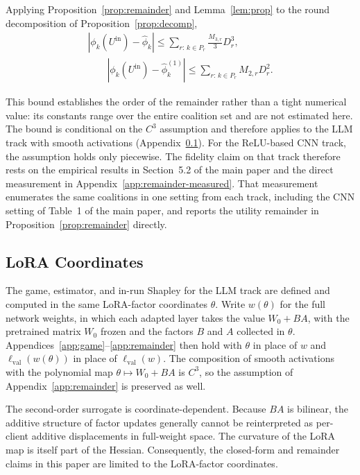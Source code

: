 \documentclass[letterpaper]{article} %
\providecommand{\lval}{\ell_{\mathrm{val}}}
\theoremstyle{definition}
\begin{document}
\begin{corollary}
\label{cor:player}
Applying Proposition~\ref{prop:remainder} and Lemma~\ref{lem:prop} to the
round decomposition of Proposition~\ref{prop:decomp},
\[
\begin{aligned}
|\phi_k(U^{\mathrm{in}}) - \hat\phi_k|
\le \sum_{r:\,k \in P_r} \tfrac{M_{3,r}}{3} D_r^3,
\\
\qquad
|\phi_k(U^{\mathrm{in}}) - \hat\phi_k^{(1)}|
\le \sum_{r:\,k \in P_r} M_{2,r} D_r^2.
\end{aligned}
\]
\end{corollary}

This bound establishes the order of the remainder rather than a tight
numerical value: its constants range over the entire coalition set and are not
estimated here. The bound is conditional on the $C^3$ assumption and therefore
applies to the LLM track with smooth activations
(Appendix~\ref{app:lora}). For the ReLU-based CNN track, the assumption holds
only piecewise. The fidelity claim on that track therefore rests on the
empirical results in Section~5.2 of the main paper and the direct measurement
in Appendix~\ref{app:remainder-measured}. That measurement enumerates the same
coalitions in one setting from each track, including the CNN setting of
Table~1 of the main paper, and reports the utility remainder in
Proposition~\ref{prop:remainder} directly.

\subsection{LoRA Coordinates}
\label{app:lora}

The game, estimator, and in-run Shapley for the LLM track are defined and
computed in the same LoRA-factor coordinates $\theta$. Write $w(\theta)$ for
the full network weights, in which each adapted layer takes the value
$W_0 + BA$, with the pretrained matrix $W_0$ frozen and the factors $B$ and
$A$ collected in $\theta$. Appendices~\ref{app:game}--\ref{app:remainder}
then hold with $\theta$ in place of $w$ and $\lval(w(\theta))$ in place of
$\lval(w)$. The composition of smooth activations with the polynomial map
$\theta \mapsto W_0 + BA$ is $C^3$, so the assumption of
Appendix~\ref{app:remainder} is preserved as well.

The second-order surrogate is coordinate-dependent. Because $BA$ is bilinear,
the additive structure of factor updates generally cannot be reinterpreted as
per-client additive displacements in full-weight space. The curvature of the
LoRA map is itself part of the Hessian. Consequently, the closed-form and
remainder claims in this paper are limited to the LoRA-factor coordinates.
\end{document}
